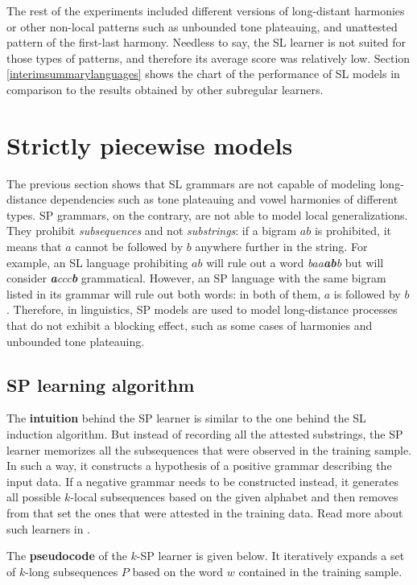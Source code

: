 The rest of the experiments included different versions of long-distant harmonies or other non-local patterns such as unbounded tone plateauing, and unattested pattern of the first-last harmony.
Needless to say, the SL learner is not suited for those types of patterns, and therefore its average score was relatively low.
Section \ref{interimsummarylanguages} shows the chart of the performance of SL models in comparison to the results obtained by other subregular learners.

\section{Strictly piecewise models}

The previous section shows that SL grammars are not capable of modeling long-distance dependencies such as tone plateauing and vowel harmonies of different types.
SP grammars, on the contrary, are not able to model local generalizations.
They prohibit \emph{subsequences} and not \emph{substrings}: if a bigram $ab$ is prohibited, it means that $a$ cannot be followed by $b$ anywhere further in the string.
For example, an SL language prohibiting $ab$ will rule out a word \emph{baa\textbf{ab}b} but will consider \emph{\textbf{a}ccc\textbf{b}} grammatical.
However, an SP language with the same bigram listed in its grammar will rule out both words: in both of them, $a$ is followed by $b$.
Therefore, in linguistics, SP models are used to model long-distance processes that do not exhibit a blocking effect, such as some cases of harmonies and unbounded tone plateauing.


\subsection{SP learning algorithm}

The \textbf{intuition} behind the SP learner is similar to the one behind the SL induction algorithm.
But instead of recording all the attested substrings, the SP learner memorizes all the subsequences that were observed in the training sample.
In such a way, it constructs a hypothesis of a positive grammar describing the input data.
If a negative grammar needs to be constructed instead, it generates all possible $k$-local subsequences based on the given alphabet and then removes from that set the ones that were attested in the training data.
Read more about such learners in \citep{Heinz10ldp}.

The \textbf{pseudocode} of the $k$-SP learner is given below.
It iteratively expands a set of $k$-long subsequences $P$ based on the word $w$ contained in the training sample.

